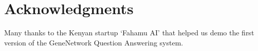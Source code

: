 \documentclass[letterpaper]{article}
\begin{document}
\section{ Acknowledgments}
Many thanks to the Kenyan startup `Fahamu AI' that helped us demo the first version of the GeneNetwork Question Answering system.


\begin{small}


\end{small}

%
\end{document}
